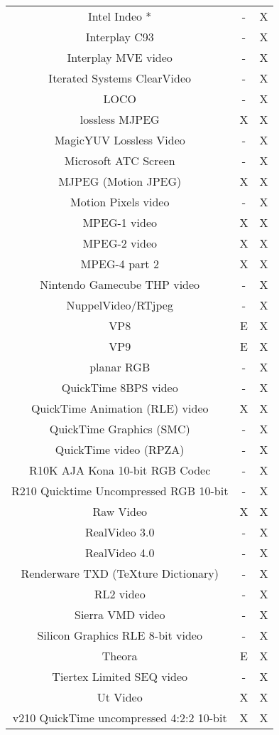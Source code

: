 \begin{table}[h]
\begin{minipage}{\textwidth}
\begin{tabular}{|c|c|c|}
      Intel Indeo * & - & X \\
      Interplay C93 & - & X \\
      Interplay MVE video & - & X \\
      Iterated Systems ClearVideo & - & X \\
      LOCO & - & X \\
      lossless MJPEG & X & X \\
      MagicYUV Lossless Video & - & X \\
      Microsoft ATC Screen & - & X \\
      MJPEG (Motion JPEG) & X & X \\
      Motion Pixels video & - & X \\
      MPEG-1 video & X & X \\
      MPEG-2 video & X & X \\
      MPEG-4 part 2 & X & X \\
      Nintendo Gamecube THP video & - & X \\
      NuppelVideo/RTjpeg & - & X \\
      VP8 & E & X \\
      VP9 & E & X \\
      planar RGB & - & X \\
      QuickTime 8BPS video & - & X \\
      QuickTime Animation (RLE) video & X & X \\
      QuickTime Graphics (SMC) & - & X \\
      QuickTime video (RPZA) & - & X \\
      R10K AJA Kona 10-bit RGB Codec & - & X \\
      R210 Quicktime Uncompressed RGB 10-bit & - & X \\
      Raw Video & X & X \\
      RealVideo 3.0 & - & X \\
      RealVideo 4.0 & - & X \\
      Renderware TXD (TeXture Dictionary) & - & X \\
      RL2 video & - & X \\
      Sierra VMD video & - & X \\
      Silicon Graphics RLE 8-bit video & - & X \\
      Theora & E & X \\
      Tiertex Limited SEQ video & - & X \\
      Ut Video & X & X \\
      v210 QuickTime uncompressed 4:2:2 10-bit & X & X \\

\end{tabular}
\end{minipage}
\end{table}
